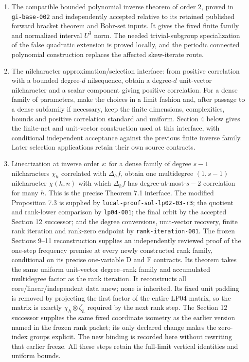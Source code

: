 \documentclass[11pt]{article}
\begin{document}
\begin{enumerate}
\item The compatible bounded polynomial inverse theorem of order $2$,
proved in \texttt{gi-base-002} and independently accepted relative to
its retained published forward bracket theorem and Bohr-set inputs.
It gives the fixed finite family and normalized interval $U^3$ norm.
The needed trivial-subgroup specialization of the false quadratic
extension is proved locally, and the periodic connected polynomial
construction replaces the affected skew-iterate route.
\item The nilcharacter approximation/selection interface: from positive
correlation with a bounded degree-$d$ nilsequence, obtain a degree-$d$
unit-vector nilcharacter and a scalar component giving positive correlation.
For a dense family of parameters, make the choices in a limit fashion and,
after passage to a dense subfamily if necessary, keep the finite dimensions,
complexities, bounds and positive correlation standard and uniform.
Section 4 below gives the finite-net and unit-vector construction used
at this interface, with conditional independent acceptance against the
previous finite inverse family. Later selection applications retain
their own source contracts.
\item Linearization at inverse order $s$: for a dense family of degree
$s-1$ nilcharacters $\chi_h$ correlated with $\Delta_hf$, obtain one
multidegree $(1,s-1)$ nilcharacter $\chi(h,n)$ with which $\Delta_h f$
has degree-at-most-$s-2$ correlation for many $h$.
This is the precise Theorem 7.1 interface. The modified Proposition 7.3
is supplied by \texttt{local-proof-sol-lp02-03-r3}; the quotient and
rank-lower comparison by \texttt{lp04-001}; the final orbit by the
accepted Section 12 successor; and the degree conversions, unit-vector
recovery, finite rank iteration and rank-zero endpoint by
\texttt{rank-iteration-001}. The frozen Sections 9--11 reconstruction
supplies an independently reviewed proof of the one-step frequency premise at
every newly constructed rank family, conditional on its precise
one-variable D and F contracts. Its theorem takes the same uniform
unit-vector degree--rank family and accumulated multidegree factor as
the rank iteration. It reconstructs all core/linear/independent data
anew; none is inherited. Its fixed unit padding is removed by projecting
the first factor of the entire LP04 matrix, so the matrix is exactly
$\chi_h\otimes\overline{\zeta_h}$ required by the next rank step.
The Section 12 successor supplies the same fixed coordinate isometry
as the earlier version named in the frozen rank packet; its only
declared change makes the zero-index groups explicit. The new binding
is recorded here without rewriting that earlier freeze. All these
steps retain the full-limit vertical identities and uniform bounds.



\end{enumerate}
\end{document}
